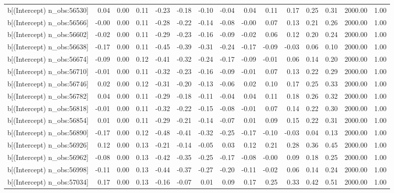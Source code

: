 \begin{table}[ht]
\begin{tabular}{rrrrrrrrrrrrrrr}
  b[(Intercept) n\_obs:56530] & 0.04 & 0.00 & 0.11 & -0.23 & -0.18 & -0.10 & -0.04 & 0.04 & 0.11 & 0.17 & 0.25 & 0.31 & 2000.00 & 1.00 \\ 
  b[(Intercept) n\_obs:56566] & -0.00 & 0.00 & 0.11 & -0.28 & -0.22 & -0.14 & -0.08 & -0.00 & 0.07 & 0.13 & 0.21 & 0.26 & 2000.00 & 1.00 \\ 
  b[(Intercept) n\_obs:56602] & -0.02 & 0.00 & 0.11 & -0.29 & -0.23 & -0.16 & -0.09 & -0.02 & 0.06 & 0.12 & 0.20 & 0.24 & 2000.00 & 1.00 \\ 
  b[(Intercept) n\_obs:56638] & -0.17 & 0.00 & 0.11 & -0.45 & -0.39 & -0.31 & -0.24 & -0.17 & -0.09 & -0.03 & 0.06 & 0.10 & 2000.00 & 1.00 \\ 
  b[(Intercept) n\_obs:56674] & -0.09 & 0.00 & 0.12 & -0.41 & -0.32 & -0.24 & -0.17 & -0.09 & -0.01 & 0.06 & 0.14 & 0.20 & 2000.00 & 1.00 \\ 
  b[(Intercept) n\_obs:56710] & -0.01 & 0.00 & 0.11 & -0.32 & -0.23 & -0.16 & -0.09 & -0.01 & 0.07 & 0.13 & 0.22 & 0.29 & 2000.00 & 1.00 \\ 
  b[(Intercept) n\_obs:56746] & 0.02 & 0.00 & 0.12 & -0.31 & -0.20 & -0.13 & -0.06 & 0.02 & 0.10 & 0.17 & 0.25 & 0.33 & 2000.00 & 1.00 \\ 
  b[(Intercept) n\_obs:56782] & 0.04 & 0.00 & 0.11 & -0.29 & -0.18 & -0.11 & -0.04 & 0.04 & 0.11 & 0.18 & 0.26 & 0.32 & 2000.00 & 1.00 \\ 
  b[(Intercept) n\_obs:56818] & -0.01 & 0.00 & 0.11 & -0.32 & -0.22 & -0.15 & -0.08 & -0.01 & 0.07 & 0.14 & 0.22 & 0.30 & 2000.00 & 1.00 \\ 
  b[(Intercept) n\_obs:56854] & 0.01 & 0.00 & 0.11 & -0.29 & -0.21 & -0.14 & -0.07 & 0.01 & 0.09 & 0.15 & 0.22 & 0.31 & 2000.00 & 1.00 \\ 
  b[(Intercept) n\_obs:56890] & -0.17 & 0.00 & 0.12 & -0.48 & -0.41 & -0.32 & -0.25 & -0.17 & -0.10 & -0.03 & 0.04 & 0.13 & 2000.00 & 1.00 \\ 
  b[(Intercept) n\_obs:56926] & 0.12 & 0.00 & 0.13 & -0.21 & -0.14 & -0.05 & 0.03 & 0.12 & 0.21 & 0.28 & 0.36 & 0.45 & 2000.00 & 1.00 \\ 
  b[(Intercept) n\_obs:56962] & -0.08 & 0.00 & 0.13 & -0.42 & -0.35 & -0.25 & -0.17 & -0.08 & -0.00 & 0.09 & 0.18 & 0.25 & 2000.00 & 1.00 \\ 
  b[(Intercept) n\_obs:56998] & -0.11 & 0.00 & 0.13 & -0.44 & -0.37 & -0.27 & -0.20 & -0.11 & -0.02 & 0.06 & 0.14 & 0.24 & 2000.00 & 1.00 \\ 
  b[(Intercept) n\_obs:57034] & 0.17 & 0.00 & 0.13 & -0.16 & -0.07 & 0.01 & 0.09 & 0.17 & 0.25 & 0.33 & 0.42 & 0.51 & 2000.00 & 1.00 \\ 

\end{tabular}
\end{table}

